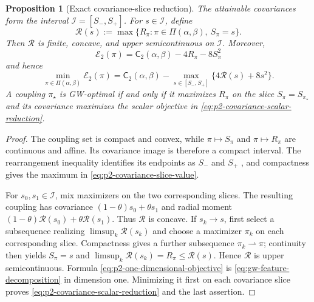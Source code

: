 \documentclass[11pt,a4paper]{article}
\newtheorem{proposition}[theorem]{Proposition}
\theoremstyle{definition}
\theoremstyle{remark}
\newcommand{\Ecal}{\mathcal E}
\newcommand{\Piopt}{\Pi}
\begin{document}
\begin{proposition}[Exact covariance-slice reduction]
\label{prop:p2-one-dimensional-scalar-reduction}
The attainable covariances form the interval
\(\mathcal I=[S_-,S_+]\).  For \(s\in\mathcal I\), define
\begin{equation}
  \mathcal R(s):=
  \max\bigl\{R_\pi:\pi\in\Piopt(\alpha,\beta),\ S_\pi=s\bigr\}.
  \label{eq:p2-covariance-slice-value}
\end{equation}
Then \(\mathcal R\) is finite, concave, and upper semicontinuous on
\(\mathcal I\).  Moreover,
\begin{equation}
  \Ecal_2(\pi)
  =\mathsf C_2(\alpha,\beta)-4R_\pi-8S_\pi^2
  \label{eq:p2-one-dimensional-objective}
\end{equation}
and hence
\begin{equation}
  \min_{\pi\in\Piopt(\alpha,\beta)}\Ecal_2(\pi)
  =\mathsf C_2(\alpha,\beta)
   -\max_{s\in[S_-,S_+]}\bigl\{4\mathcal R(s)+8s^2\bigr\}.
  \label{eq:p2-covariance-scalar-reduction}
\end{equation}
A coupling \(\pi_\star\) is GW-optimal if and only if it maximizes
\(R_\pi\) on the slice \(S_\pi=S_{\pi_\star}\) and its covariance maximizes
the scalar objective in \eqref{eq:p2-covariance-scalar-reduction}.
\end{proposition}

\begin{proof}
The coupling set is compact and convex, while \(\pi\mapsto S_\pi\) and
\(\pi\mapsto R_\pi\) are continuous and affine.  Its covariance image is
therefore a compact interval.  The rearrangement inequality identifies its
endpoints as \(S_-\) and \(S_+\) \citep{Santambrogio2015}, and compactness
gives the maximum in \eqref{eq:p2-covariance-slice-value}.

For \(s_0,s_1\in\mathcal I\), mix maximizers on the two corresponding slices.
The resulting coupling has covariance \((1-\theta)s_0+\theta s_1\) and radial
moment \((1-\theta)\mathcal R(s_0)+\theta\mathcal R(s_1)\).  Thus
\(\mathcal R\) is concave.  If \(s_k\to s\), first select a subsequence
realizing \(\limsup_k\mathcal R(s_k)\) and choose a maximizer \(\pi_k\) on
each corresponding slice.  Compactness gives a further subsequence
\(\pi_k\rightharpoonup\pi\); continuity then yields
\(S_\pi=s\) and
\(\limsup_k\mathcal R(s_k)=R_\pi\leq\mathcal R(s)\).  Hence \(\mathcal R\) is upper
semicontinuous.  Formula \eqref{eq:p2-one-dimensional-objective} is
\eqref{eq:gw-feature-decomposition} in dimension one.  Minimizing it first on
each covariance slice proves \eqref{eq:p2-covariance-scalar-reduction} and the
last assertion.
\end{proof}
\end{document}

